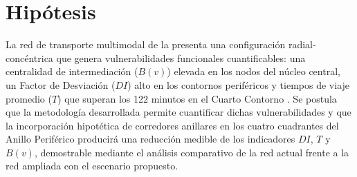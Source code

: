 \section{Hipótesis}
\label{sec:hipotesis}

La red de transporte multimodal de la \zmvm{} presenta una configuración
radial-concéntrica que genera vulnerabilidades funcionales cuantificables: una
centralidad de intermediación ($B(v)$) elevada en los nodos del núcleo central,
un Factor de Desviación ($DI$) alto en los contornos periféricos y tiempos de
viaje promedio ($T$) que superan los 122 minutos en el Cuarto Contorno
\citep{semovi2020diagnostico}. Se postula que la metodología desarrollada
permite cuantificar dichas vulnerabilidades y que la incorporación hipotética de
corredores anillares en los cuatro cuadrantes del Anillo Periférico producirá
una reducción medible de los indicadores $DI$, $T$ y $B(v)$, demostrable
mediante el análisis comparativo de la red actual frente a la red ampliada con
el escenario propuesto.

